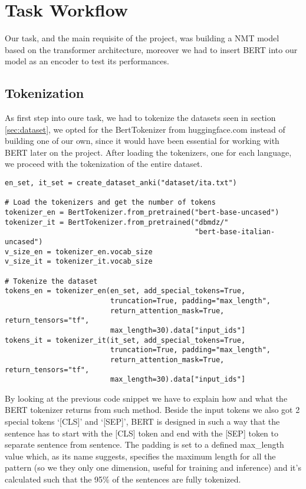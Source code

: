\section{Task Workflow}\label{sec:task_workflow}
Our task, and the main requisite of the project, was building a NMT model based on the transformer architecture, moreover we had to insert BERT into our model as an encoder to test its performances.
\subsection{Tokenization}\label{subsec:tokenization}
As first step into oure task, we had to tokenize the datasets seen in section \ref{sec:dataset}, we opted for the BertTokenizer from huggingface.com instead of building one of our own, since it would have been essential for working with BERT later on the project. After loading the tokenizers, one for each language, we proceed with the tokenization of the entire dataset.
\begin{verbatim}
en_set, it_set = create_dataset_anki("dataset/ita.txt")

# Load the tokenizers and get the number of tokens
tokenizer_en = BertTokenizer.from_pretrained("bert-base-uncased")
tokenizer_it = BertTokenizer.from_pretrained("dbmdz/"
                                             "bert-base-italian-uncased")
v_size_en = tokenizer_en.vocab_size
v_size_it = tokenizer_it.vocab_size

# Tokenize the dataset
tokens_en = tokenizer_en(en_set, add_special_tokens=True,
                         truncation=True, padding="max_length", 
                         return_attention_mask=True, return_tensors="tf",
                         max_length=30).data["input_ids"]
tokens_it = tokenizer_it(it_set, add_special_tokens=True,
                         truncation=True, padding="max_length", 
                         return_attention_mask=True, return_tensors="tf",
                         max_length=30).data["input_ids"]
\end{verbatim}

By looking at the previous code snippet we have to explain how and what the BERT tokenizer returns from such method.
Beside the input tokens we also got 2 special tokens ‘[CLS]’ and ‘[SEP]’, BERT is designed in such a way that the sentence has to start with the [CLS] token and end with the [SEP] token to separate sentence from sentence. The padding is set to a defined max\_length value which, as its name suggests, specifies the maximum length for all the pattern (so we they only one dimension, useful for training and inference) and it's calculated such that the 95\% of the sentences are fully tokenized.
\vspace{3mm}


